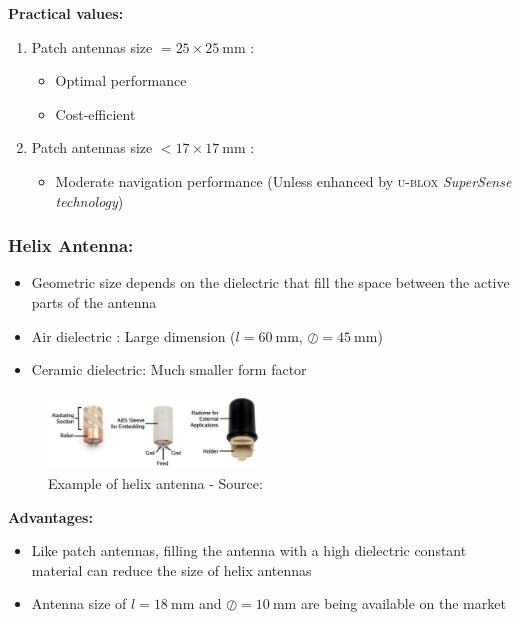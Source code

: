 \documentclass[report.tex]{subfiles}
\begin{document}
\begin{flushleft}
\textbf{Practical values:}
\end{flushleft}
\begin{enumerate}
\item Patch antennas size $= 25 \times \SI{25}{\milli\meter}$ :
\begin{itemize}
\item Optimal performance
\item Cost-efficient
\end{itemize}
\item Patch antennas size $< 17 \times \SI{17}{\milli\meter}$ :
\begin{itemize}
\item Moderate navigation performance (Unless enhanced by \textsc{u-blox} \textit{SuperSense technology})
\end{itemize}
\end{enumerate}


\subsubsection{Helix Antenna:}

\begin{itemize}
\item Geometric size depends on the dielectric that fill the space between the active parts of the antenna
\item Air dielectric : Large dimension ($l = \SI{60}{\milli\meter}$, $\oslash = \SI{45}{\milli\meter}$)
\item Ceramic dielectric: Much smaller form factor
\end{itemize}

\begin{figure}[H]
	\centering
	\includegraphics[width=0.5\textwidth]{Include/Figure/antenna/helix_ant.png}
	\caption{Example of helix antenna - Source:\cite{gnss_ant_intro}}
	\label{fig:helix_ant}
\end{figure}

\begin{flushleft}
\textbf{Advantages:}
\end{flushleft}
\begin{itemize}
\item Like patch antennas, filling the antenna with a high dielectric constant material can reduce the size of helix antennas
\item Antenna size of $l=\SI{18}{\milli\meter}$ and $\oslash = \SI{10}{\milli\meter}$ are being available on the market
\end{itemize}
\end{document}
